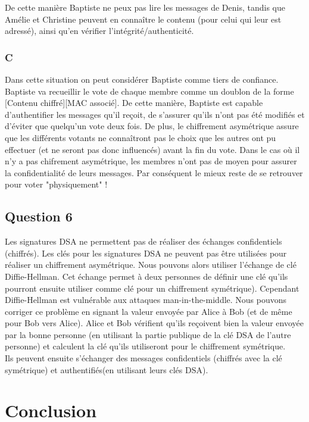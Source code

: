 \documentclass[a4paper, 11pt, oneside]{article}
\begin{document}
De cette manière Baptiste ne peux pas lire les messages de Denis, tandis que Amélie et Christine peuvent en connaître le contenu (pour celui qui leur est adressé), ainsi qu'en vérifier l'intégrité/authenticité.

\subsubsection{C}

Dans cette situation on peut considérer Baptiste comme tiers de confiance. Baptiste va recueillir le vote de chaque membre comme un doublon de la forme [Contenu chiffré][MAC associé]. De cette manière, Baptiste est capable d'authentifier les messages qu'il reçoit, de s'assurer qu'ils n'ont pas été modifiés et d'éviter que quelqu'un vote deux fois. De plus, le chiffrement asymétrique assure que les différents votants ne connaîtront pas le choix que les autres ont pu effectuer (et ne seront pas donc influencés) avant la fin du vote.
Dans le cas où il n'y a pas chifrement asymétrique, les membres n'ont pas de moyen pour assurer la confidentialité de leurs messages. Par conséquent le mieux reste de se retrouver pour voter "physiquement" !

\subsection{Question 6}

Les signatures DSA ne permettent pas de réaliser des échanges confidentiels (chiffrés). Les clés pour les signatures DSA ne peuvent pas être utilisées pour réaliser un chiffrement asymétrique.
Nous pouvons alors utiliser l'échange de clé Diffie-Hellman. Cet échange permet à deux personnes de définir une clé qu'ils pourront ensuite utiliser comme clé pour un chiffrement symétrique).
Cependant Diffie-Hellman est vulnérable aux attaques man-in-the-middle. Nous pouvons corriger ce problème en signant la valeur envoyée par Alice à Bob (et de même pour Bob vers Alice). Alice et Bob vérifient qu'ils reçoivent bien la valeur envoyée par la bonne personne (en utilisant la partie publique de la clé DSA de l'autre personne) et calculent la clé qu'ils utiliseront pour le chiffrement symétrique.
\\
Ils peuvent ensuite s'échanger des messages confidentiels (chiffrés avec la clé symétrique) et authentifiés(en utilisant leurs clés DSA).

\section*{Conclusion}
\end{document}
